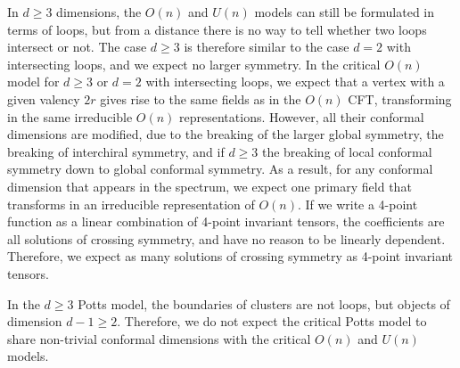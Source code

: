 \documentclass[12pt, a4paper]{article}
\theoremstyle{break}
\begin{document}
In $d\geq 3$ dimensions, the $O(n)$ and $U(n)$ models can still be formulated in terms of loops, but
from a distance there is no way to tell whether two loops intersect or not. The case $d\geq 3$ is therefore similar to the case $d=2$ with intersecting loops, and we expect no larger symmetry. 
In the critical $O(n)$ model for $d\geq 3$ or $d=2$ with intersecting loops, we expect that a vertex with a given valency $2r$ gives rise to the same fields as in the $O(n)$ CFT, transforming in the same irreducible $O(n)$ representations. However, all their conformal dimensions are modified, due to the breaking of the larger global symmetry, the breaking of interchiral symmetry, and if $d\geq 3$ the breaking of local conformal symmetry down to global conformal symmetry. As a result, for any conformal dimension that appears in the spectrum, we expect one primary field that transforms in an irreducible representation of $O(n)$. If we write a 4-point function as a linear combination of 4-point invariant tensors, the coefficients are all solutions of crossing symmetry, and have no reason to be linearly dependent. Therefore, we expect as many solutions of crossing symmetry as 4-point invariant tensors. 

In the $d\geq 3$ Potts model, the boundaries of clusters are not loops, but objects of dimension $d-1\geq 2$. Therefore, we do not expect the critical Potts model to share non-trivial conformal dimensions with the critical $O(n)$ and $U(n)$ models. 





\printindex
\end{document}
